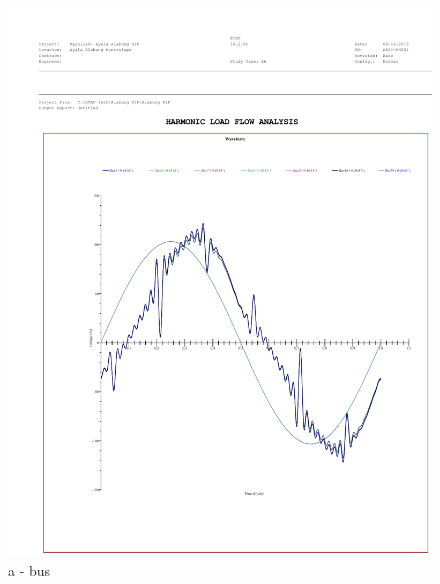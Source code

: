 \begin{figure}
	\begin{minipage}[b]{1\linewidth}
		\centering
		\includegraphics[scale=0.6]{figures/R1P_HA/R1P_HA_bus_waveform}
		\caption*{a - bus}
	\end{minipage}
	\hspace{0.05cm}
	\begin{minipage}[b]{1\linewidth}
		\centering

\end{minipage}
\end{figure}
